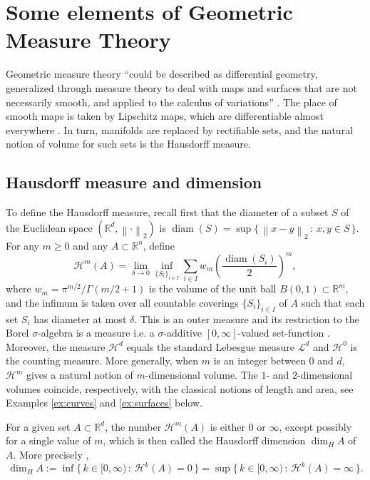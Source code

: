 \documentclass[runningheads]{llncs}
\newcommand{\norm}[1]{\left\|#1\right\|}
\newcommand{\Rr}{\mathbb{R}}
\newcommand{\set}[2]{\{\,#1 \, : \, #2\,\} }
\newcommand{\diam}{\operatorname{diam}}
\begin{document}
\section{Some elements of Geometric Measure Theory}

Geometric measure theory ``could be described as differential geometry, generalized through measure theory to deal with maps and surfaces that are not necessarily smooth, and applied to the calculus of variations'' \cite{Morgan2008}.  The place of smooth maps is taken by Lipschitz maps, which are differentiable almost everywhere \cite[p. 46]{Ambrosio2000}. In turn, manifolds are replaced by rectifiable sets, and  the natural notion of volume for such sets is the Hausdorff measure. 

\subsection{Hausdorff measure and dimension}
To define the Hausdorff measure, recall first that the diameter of a subset $S$ of the Euclidean space $(\Rr^d,\norm{\cdot}_2)$ is  
$\diam(S) = \sup\set{\norm{x-y}_2}{x,y\in S}.$
 For any $m\geq 0$ and any  $A\subset \Rr^n$, define 
\begin{equation}\label{eq:Hausdorff_meas}
\mathcal H^m(A) = \lim_{\delta\to 0} \inf_{\{S_i\}_{i\in I}} \sum_{i\in I} w_m \left(\frac {\diam(S_i)}{2}\right)^m,
\end{equation}
where $w_m=\pi^{m/2}/\Gamma(m/2+1)$ is the volume of the unit ball $B(0,1)\subset \Rr^m$,  and the infimum is taken over all countable coverings $\{S_i\}_{i\in I}$ of $A$ such that each set $S_i$ has diameter at most $\delta$.  This is an outer measure and its restriction to  the Borel $\sigma$-algebra is a measure i.e. a $\sigma$-additive $[0,\infty]$-valued set-function  \cite[Thm. 1.49]{Ambrosio2000}. Moreover, the measure $\mathcal H^d$ equals the standard Lebesgue measure $\mathcal L^d$ \cite[Thm. 2.53]{Ambrosio2000} and $\mathcal H^0$ is the counting measure. More generally, when $m$ is an integer between $0$ and $d$, $\mathcal H^m$ gives a natural notion of $m$-dimensional volume. The $1$- and $2$-dimensional volumes coincide, respectively, with the classical notions of length and area, see Examples \ref{ex:curves} and \ref{ex:surfaces} below.

For a given set $A\subset \Rr^d$, the number $\mathcal H^m(A)$ is either $0$ or $\infty$, except possibly for a single value of $m$, which is then called the Hausdorff dimension $\dim_H A$ of $A$. More precisely \cite[Def. 2.51]{Ambrosio2000},
\begin{equation}
    \dim_H A := \inf\set{k\in[0,\infty)}{\mathcal H^k (A)=0} = \sup\set{k\in[0,\infty)}{\mathcal H^k (A) = \infty}.
\end{equation}
\end{document}
